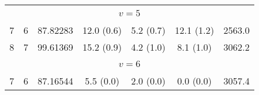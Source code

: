 \begin{table*}[htp]
\begin{tabular}{ccccccc}
&\vspace{-0.75em}\\
\multicolumn{7}{c}{$v = 5$} \\
\vspace{-0.75em}\\
 7 & 6 & 87.82283 & 12.0 (0.6) & 5.2 (0.7) & 12.1 (1.2) & 2563.0 \\
 8 & 7 & 99.61369 & 15.2 (0.9) & 4.2 (1.0) & 8.1 (1.0) & 3062.2 \\
\hline
&\vspace{-0.75em}\\
\multicolumn{7}{c}{$v = 6$} \\
\vspace{-0.75em}\\
 7 & 6 & 87.16544 & 5.5 (0.0) & 2.0 (0.0) & 0.0 (0.0) & 3057.4 \\
\end{tabular}

\par 
\end{table*}
